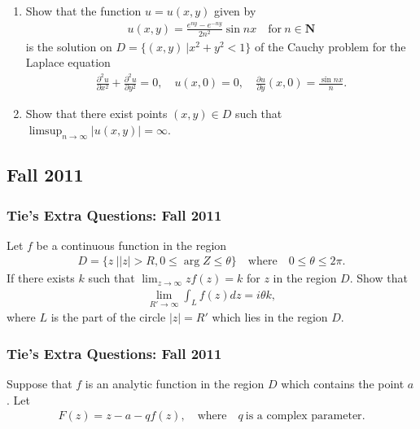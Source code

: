 \begin{enumerate}
\def\labelenumi{(\arabic{enumi})}
\tightlist
\item
  Show that the function \(u=u(x,y)\) given by
  \begin{align*}u(x,y)=\frac{e^{ny}-e^{-ny}}{2n^2}\sin nx\quad \text{for}\ n\in {\mathbf N}\end{align*}
  is the solution on \(D=\{(x,y)\ | x^2+y^2<1\}\) of the Cauchy problem
  for the Laplace equation
  \begin{align*}\frac{\partial ^2u}{\partial x^2}+\frac{\partial ^2u}{\partial y^2}=0,\quad
  u(x,0)=0,\quad \frac{\partial u}{\partial y}(x,0)=\frac{\sin nx}{n}.\end{align*}
\item
  Show that there exist points \((x,y)\in D\) such that
  \(\displaystyle{\limsup_{n\to\infty} |u(x,y)|=\infty}\).
\end{enumerate}

\hypertarget{fall-2011}{%
\subsection{Fall 2011}\label{fall-2011}}

\hypertarget{ties-extra-questions-fall-2011}{%
\subsubsection{Tie's Extra Questions: Fall
2011}\label{ties-extra-questions-fall-2011}}

Let \(f\) be a continuous function in the region
\begin{align*}D=\{z\ |  |z|>R, 0\leq \arg Z\leq \theta\}\quad\text{where}\quad
0\leq \theta \leq 2\pi.\end{align*}
If there exists \(k\) such that
\(\displaystyle{\lim_{z\to\infty} zf(z)=k}\) for \(z\) in the region
\(D\). Show that
\begin{align*}\lim_{R'\to\infty} \int_{L} f(z) dz=i\theta k,\end{align*}
where \(L\) is the part of the circle \(|z|=R'\) which lies in the
region \(D\).

\hypertarget{ties-extra-questions-fall-2011-1}{%
\subsubsection{Tie's Extra Questions: Fall
2011}\label{ties-extra-questions-fall-2011-1}}

Suppose that \(f\) is an analytic function in the region \(D\) which
contains the point \(a\). Let
\begin{align*}F(z)= z-a-qf(z),\quad \text{where}\quad q \ \text{is a complex
parameter}.\end{align*}

